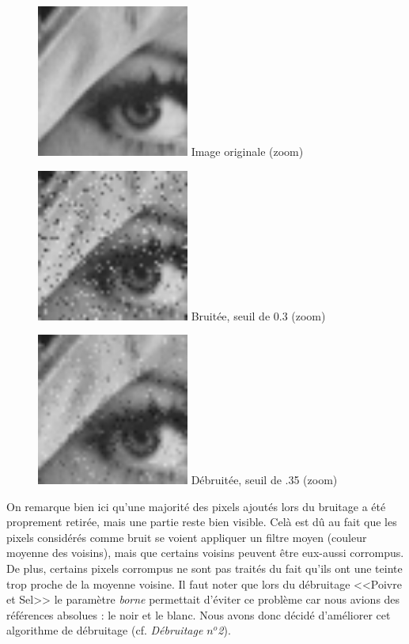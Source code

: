 \documentclass{article}
\begin{document}
		\begin{figure}[!ht]
			\centering
			\begin{minipage}[t]{5cm}
				\centering
				\includegraphics[width=5cm,height=5cm]{lenaZOOM.jpg}
				Image originale (zoom)
			\end{minipage}
			\begin{minipage}[t]{5cm}
				\centering
				\includegraphics[width=5cm,height=5cm]{Additive/noisy_30_ZOOM.jpg}
				Bruitée, seuil de 0.3 (zoom)
			\end{minipage}
			\begin{minipage}[t]{5cm}
				\centering
				\includegraphics[width=5cm,height=5cm]{Additive/algo1_30_ZOOM.jpg}
				Débruitée, seuil de .35 (zoom)
			\end{minipage}
		\end{figure}
		On remarque bien ici qu'une majorité des pixels ajoutés lors du bruitage a été proprement retirée, mais une partie reste bien visible. Celà est dû au fait que les pixels considérés comme bruit se voient appliquer un filtre moyen (couleur moyenne des voisins), mais que certains voisins peuvent être eux-aussi corrompus. De plus, certains pixels corrompus ne sont pas traités du fait qu'ils ont une teinte trop proche de la moyenne voisine. Il faut noter que lors du débruitage <<Poivre et Sel>> le paramètre \emph{borne} permettait d'éviter ce problème car nous avions des références absolues : le noir et le blanc. Nous avons donc décidé d'améliorer cet algorithme de débruitage (cf. \emph{Débruitage \begin{math}n^o\end{math}2}).\\\\
		
\end{document}
